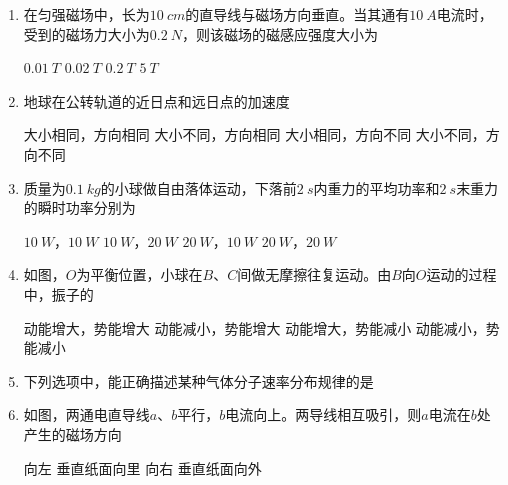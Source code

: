\begin{enumerate}
\item
在匀强磁场中，长为$ 10 \ cm $的直导线与磁场方向垂直。当其通有$ 10 \ A $电流时，受到的磁场力大小为$ 0.2 \ N $，则该磁场的磁感应强度大小为  

\fourchoices
{$ 0.01 \ T $}
{$ 0.02 \ T $}
{$ 0.2 \ T $}
{$ 5 \ T $}




\item
地球在公转轨道的近日点和远日点的加速度  

\fourchoices
{大小相同，方向相同}
{大小不同，方向相同}
{大小相同，方向不同}
{大小不同，方向不同}




\item
质量为$ 0.1 \ kg $的小球做自由落体运动，下落前$ 2 \ s $内重力的平均功率和$ 2 \ s $末重力的瞬时功率分别为  

\fourchoices
{$ 10 \ W $，$ 10 \ W $}
{$ 10 \ W $，$ 20 \ W $}
{$ 20 \ W $，$ 10 \ W $}
{$ 20 \ W $，$ 20 \ W $}



\item
如图，$ O $为平衡位置，小球在$ B $、$ C $间做无摩擦往复运动。由$ B $向$ O $运动的过程中，振子的  
\begin{figure}[h!]
\centering

\end{figure}

\fourchoices
{动能增大，势能增大}
{动能减小，势能增大}
{动能增大，势能减小}
{动能减小，势能减小}


\item 
下列选项中，能正确描述某种气体分子速率分布规律的是  

\pfourchoices
{}
{}
{}
{}




\item
如图，两通电直导线$ a $、$ b $平行，$ b $电流向上。两导线相互吸引，则$ a $电流在$ b $处产生的磁场方向  
\begin{figure}[h!]
\centering

\end{figure}

\fourchoices
{向左}
{垂直纸面向里}
{向右}
{垂直纸面向外}







\end{enumerate}

